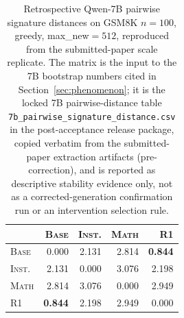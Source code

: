 \begin{table}[H]
\centering
\scriptsize
\setlength{\tabcolsep}{3pt}
\caption{Retrospective Qwen-7B pairwise signature distances on GSM8K
$n{=}100$, greedy, max\_new$=512$, reproduced from the submitted-paper scale
replicate.  The matrix is the input to the 7B bootstrap numbers cited in
Section~\ref{sec:phenomenon}; it is the locked 7B pairwise-distance table
\texttt{7b\_pairwise\_signature\_distance.csv} in the post-acceptance
release package, copied verbatim from the submitted-paper extraction
artifacts (pre-correction), and is reported as descriptive stability
evidence only, not as a corrected-generation confirmation run or an
intervention selection rule.}
\label{tab:scale7b-distance}
\begin{tabular}{lrrrr}
\toprule
 & \textsc{Base} & \textsc{Inst.} & \textsc{Math} & \textsc{R1} \\
\midrule
\textsc{Base} & 0.000 & 2.131 & 2.814 & \textbf{0.844} \\
\textsc{Inst.} & 2.131 & 0.000 & 3.076 & 2.198 \\
\textsc{Math} & 2.814 & 3.076 & 0.000 & 2.949 \\
\textsc{R1} & \textbf{0.844} & 2.198 & 2.949 & 0.000 \\
\bottomrule
\end{tabular}
\end{table}

